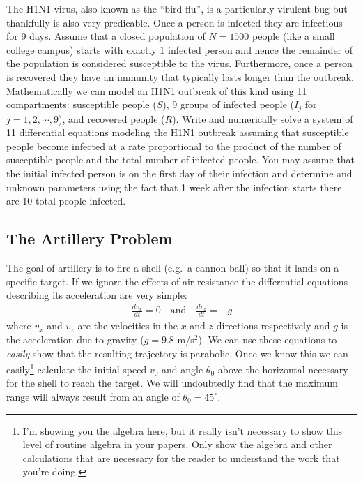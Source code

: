 \documentclass[
]{book}
\theoremstyle{definition}
\theoremstyle{definition}
\theoremstyle{definition}
\theoremstyle{remark}
\begin{document}
The H1N1 virus, also known as the ``bird flu'', is a particularly virulent
bug but thankfully is also very predicable. Once a person is infected
they are infectious for 9 days. Assume that a closed population of
\(N = 1500\) people (like a small college campus) starts with exactly 1
infected person and hence the remainder of the population is considered
susceptible to the virus. Furthermore, once a person is recovered they
have an immunity that typically lasts longer than the outbreak.
Mathematically we can model an H1N1 outbreak of this kind using 11
compartments: susceptible people (\(S\)), 9 groups of infected people
(\(I_j\) for \(j=1, 2, \cdots, 9\)), and recovered people (\(R\)). Write and
numerically solve a system of 11 differential equations modeling the
H1N1 outbreak assuming that susceptible people become infected at a rate
proportional to the product of the number of susceptible people and the
total number of infected people. You may assume that the initial
infected person is on the first day of their infection and determine and
unknown parameters using the fact that 1 week after the infection starts
there are 10 total people infected.

\newpage

\hypertarget{the-artillery-problem}{%
\subsection{The Artillery Problem}\label{the-artillery-problem}}

The goal of artillery is to fire a shell (e.g.~a cannon ball) so that it
lands on a specific target. If we ignore the effects of air resistance
the differential equations describing its acceleration are very simple:
\[\begin{aligned}
    \frac{dv_x}{dt} = 0 \quad \text{and} \quad \frac{dv_z}{dt} = -g \label{eqn:no-air-res}\end{aligned}\]
where \(v_x\) and \(v_z\) are the velocities in the \(x\) and \(z\) directions
respectively and \(g\) is the acceleration due to gravity (\(g = 9.8\)
m/s\(^2\)). We can use these equations to \emph{easily} show that the resulting
trajectory is parabolic. Once we know this we can easily\footnote{I'm showing you the algebra here, but it really isn't necessary to
  show this level of routine algebra in your papers. Only show the
  algebra and other calculations that are necessary for the reader to
  understand the work that you're doing.} calculate
the initial speed \(v_0\) and angle \(\theta_0\) above the horizontal
necessary for the shell to reach the target. We will undoubtedly find
that the maximum range will always result from an angle of
\(\theta_0 = 45^\circ\).
\end{document}
